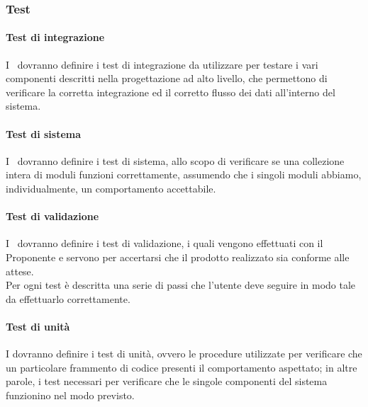\documentclass[../NormeDiProgetto.tex]{subfiles}
\begin{document}
				\subsubsection{Test}
					\paragraph{Test di integrazione\\}   
					I \progettisti\ dovranno definire i test di integrazione da utilizzare per testare i vari
					componenti descritti nella progettazione ad alto livello, che permettono di verificare la
					corretta integrazione ed il corretto flusso dei dati all’interno del sistema.
					
					\paragraph{Test di sistema\\}       
					I \progettisti\ dovranno definire i test di sistema, allo scopo di verificare se una collezione intera
					di moduli funzioni correttamente, assumendo che i singoli moduli abbiamo, individualmente, un comportamento accettabile.
					
					\paragraph{Test di validazione\\}    
					I \progettisti\ dovranno definire i test di validazione, i quali vengono effettuati con il Proponente e servono per accertarsi che il
					prodotto realizzato sia conforme alle attese. \\
					Per ogni test è descritta una serie di passi che l’utente deve seguire in modo tale da
					effettuarlo correttamente.
					
					\paragraph{Test di unità\\}     
					I \progettisti dovranno definire i test di unità, ovvero le procedure utilizzate per verificare che un particolare frammento di codice presenti il comportamento aspettato; in altre parole, i test necessari per verificare che le singole
					componenti del sistema funzionino nel modo previsto.
					
\end{document}

